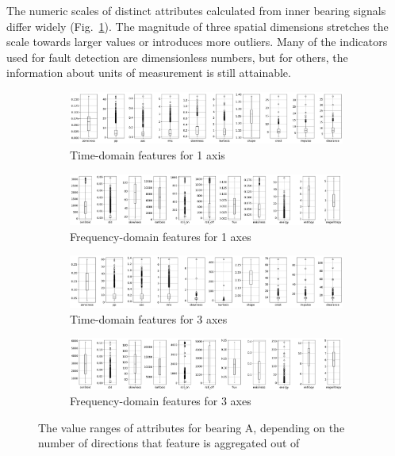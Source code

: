 The numeric scales of distinct attributes calculated from inner bearing signals differ widely (Fig.~\ref{fig:design:feature-range}). The magnitude of three spatial dimensions stretches the scale towards larger values or introduces more outliers. Many of the indicators used for fault detection are dimensionless numbers, but for others, the information about units of measurement is still attainable.

\begin{figure}[h]
    \centering
    \begin{subfigure}[b]{0.48\textwidth}
        \includegraphics[width=\textwidth]{assets/results/feature-values/features-TD-dim1-A.png}
        \caption{Time-domain features for 1 axis}
    \end{subfigure}
    \hfill
    \begin{subfigure}[b]{0.48\textwidth}
        \includegraphics[width=\textwidth]{assets/results/feature-values/features-FD-dim1-A.png}
        \caption{Frequency-domain features for 1 axes}
    \end{subfigure}
    \begin{subfigure}[b]{0.48\textwidth}
        \includegraphics[width=\textwidth]{assets/results/feature-values/features-TD-dim3-A.png}
        \caption{Time-domain features for 3 axes}
    \end{subfigure}
    \hfill
    \begin{subfigure}[b]{0.48\textwidth}
        \includegraphics[width=\textwidth]{assets/results/feature-values/features-FD-dim3-A.png}
        \caption{Frequency-domain features for 3 axes}
    \end{subfigure}
    \caption{The value ranges of attributes for bearing A, depending on the number of directions that feature is aggregated out of}
    \label{fig:design:feature-range}
\end{figure}

